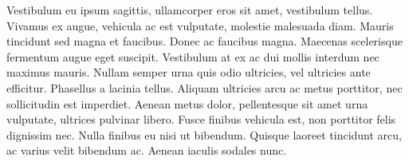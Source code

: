 Vestibulum eu ipsum sagittis, ullamcorper eros sit amet, vestibulum tellus. 
Vivamus ex augue, vehicula ac est vulputate, molestie malesuada diam. 
Mauris tincidunt sed magna et faucibus. Donec ac faucibus magna. 
Maecenas scelerisque fermentum augue eget suscipit. 
Vestibulum at ex ac dui mollis interdum nec maximus mauris. 
Nullam semper urna quis odio ultricies, vel ultricies ante efficitur. Phasellus a lacinia tellus. 
Aliquam ultricies arcu ac metus porttitor, nec sollicitudin est imperdiet. 
Aenean metus dolor, pellentesque sit amet urna vulputate, ultrices pulvinar libero. 
Fusce finibus vehicula est, non porttitor felis dignissim nec. 
Nulla finibus eu nisi ut bibendum. Quisque laoreet tincidunt arcu, ac varius velit bibendum ac. 
Aenean iaculis sodales nunc. 
